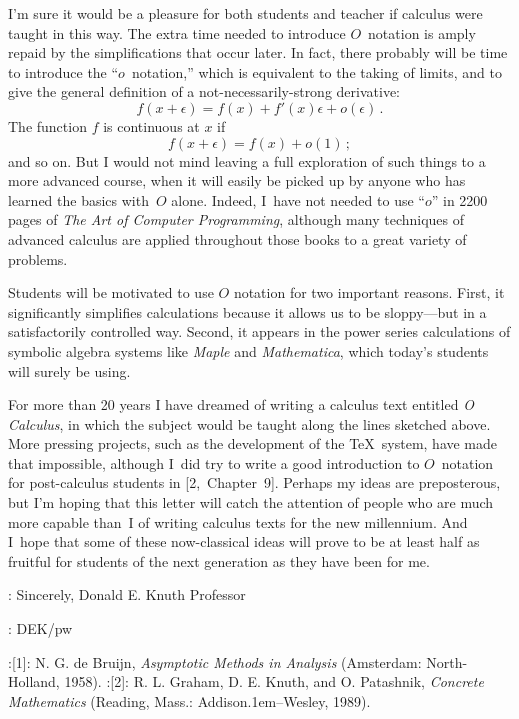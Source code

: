 I'm sure it would be a pleasure for both students and teacher if calculus
were taught in this way.  The extra time needed to introduce $O$~notation
is amply repaid by the simplifications that occur later.  In fact, there
probably will be time to introduce the ``$o$~notation,'' which is
equivalent to the taking of limits, and to give the general definition
of a not-necessarily-strong derivative:
$$f(x+\epsilon)=f(x)+f'(x)\epsilon+o(\epsilon)\,.$$
The function $f$ is continuous at $x$ if
$$f(x+\epsilon)=f(x)+o(1)\,;$$
and so on.  But I would not mind leaving a full exploration of such things
to a more advanced course, when it will easily be picked up by anyone who
has learned the basics with~$O$ alone.  Indeed, I~have not needed to use
``$o$'' in 2200 pages of {\sl The Art of Computer Programming}, although
many techniques of advanced calculus are applied throughout those books to
a great variety of problems.

Students will be motivated to use $O$ notation for two important
reasons. First, it significantly simplifies calculations because it allows
us to be sloppy---but in a satisfactorily controlled way.  Second, it
appears in the power series calculations of symbolic algebra systems like
{\sl Maple\/} and {\sl Mathematica}, which today's students will surely be
using.

For more than 20 years I have dreamed of writing a calculus text entitled
{\sl O Calculus}, in which the subject would be taught along the lines
sketched above.  More pressing projects, such as the development of the
\TeX\ system, have made that impossible, although I~did try to write a good
introduction to $O$~notation for post-calculus students in [2,~Chapter~9].
Perhaps my ideas are preposterous, but I'm hoping that this letter will
catch the attention of people who are much more capable than~I of writing
calculus texts for the new millennium.  And I~hope that some of these
now-classical ideas will prove to be at least half as fruitful for
students of the next generation as they have been for me.

\adx 150pt:
Sincerely,\cr
Donald E. Knuth\cr
Professor\cr

:
DEK/pw\cr

\medskip

\disleft 20pt:[1]:
N. G. de Bruijn, {\sl Asymptotic Methods in Analysis\/} (Amsterdam:
North-Holland, 1958).
\smallskip
\disleft 20pt:[2]:
R. L. Graham, D. E. Knuth, and O. Patashnik, {\sl Concrete Mathematics\/}
(Reading, Mass.: Addison\kern.1em--Wesley, 1989).

\bye
